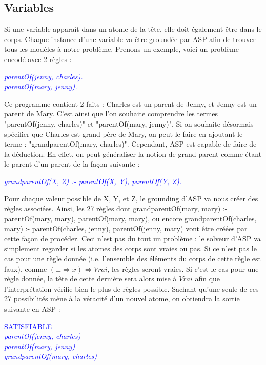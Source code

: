 \documentclass[12pt,a4paper]{article}
\begin{document}
\subsection{Variables}
Si une variable apparaît dans un atome de la tête, elle doit également être dans le corps. Chaque instance d'une variable va être groundée par ASP afin de trouver tous les modèles à notre problème.
Prenons un exemple, voici un problème encodé avec 2 règles :
\begin{center}
\emph{
	\textcolor{blue}{
  parentOf(jenny, charles).\\
  parentOf(mary, jenny).
	}
}
\end{center}
Ce programme contient 2 faits : Charles est un parent de Jenny, et Jenny est un parent de Mary. C'est ainsi que l'on souhaite comprendre les termes "parentOf(jenny, charles)" et "parentOf(mary, jenny)".
Si on souhaite désormais spécifier que Charles est grand père de Mary, on peut le faire en ajoutant le terme : "grandparentOf(mary, charles)". Cependant, ASP est capable de faire de la déduction.
En effet, on peut généraliser la notion de grand parent comme étant le parent d'un parent de la façon suivante :
\begin{center}
\emph{
	\textcolor{blue}{
  grandparentOf(X, Z) :- parentOf(X, Y), parentOf(Y, Z).
	}
}
\end{center}
Pour chaque valeur possible de X, Y, et Z, le grounding d'ASP va nous créer des règles associées.
Ainsi, les 27 règles dont grandparentOf(mary, mary) :- parentOf(mary, mary), parentOf(mary, mary), ou encore grandparentOf(charles, mary) :- parentOf(charles, jenny), parentOf(jenny, mary) vont être créées 
par cette façon de procéder. Ceci n'est pas du tout un problème : le solveur d'ASP va simplement regarder si les atomes des corps sont vraies ou pas. Si ce n'est pas le cas pour une règle donnée (i.e. l'ensemble des éléments 
du corps de cette règle est faux), comme $(\bot\Rightarrow x)\Leftrightarrow Vrai$, les règles seront vraies. Si c'est le cas pour une règle donnée, la tête de cette dernière sera alors mise à $Vrai$ afin que l'interprétation 
vérifie bien le plus de règles possible. Sachant qu'une seule de ces 27 possibilités mène à la véracité d'un nouvel atome, on obtiendra la sortie suivante en ASP :
\begin{center}
\textcolor{blue}{
  SATISFIABLE\\
	\emph{
  parentOf(jenny, charles)\\
  parentOf(mary, jenny)\\
  grandparentOf(mary, charles)
	}
}
\end{center}
\end{document}

